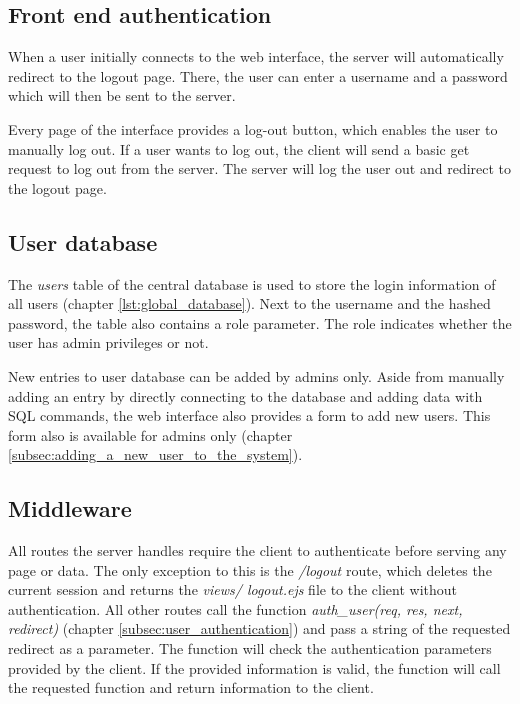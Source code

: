 \subsection{Front end authentication}
\label{subsec:front_end_authentication}
When a user initially connects to the web interface, the server will automatically redirect to the logout page. There, the user can enter a username and a password which will then be sent to the server.

Every page of the interface provides a log-out button, which enables the user to manually log out. 
If a user wants to log out, the client will send a basic get request to log out from the server. The server will log the user out and redirect to the logout page.



\subsection{User database}
\label{subsec:user_database}

The \textit{users} table of the central database is used to store the login information of all users (chapter \ref{lst:global_database}). Next to the username and the hashed password, the table also contains a role parameter.  The role indicates whether the user has admin privileges or not.

New entries to user database can be added by admins only. Aside from manually adding an entry by directly connecting to the database and adding data with SQL commands, the web interface also provides a form to add new users. This form also is available for admins only (chapter \ref{subsec:adding_a_new_user_to_the_system}).



\subsection{Middleware}
\label{subsec:routing}
All routes the server handles require the client to authenticate before serving any page or data. The only exception to this is the \textit{/logout} route, which deletes the current session and returns the \textit{views/ logout.ejs} file to the client without authentication. All other routes call the function \textit{auth\_user(req, res, next, redirect)} (chapter \ref{subsec:user_authentication}) and pass a string of the requested redirect as a parameter. The function will check the authentication parameters provided by the client. If the provided information is valid, the function will call the requested function and return information to the client.



